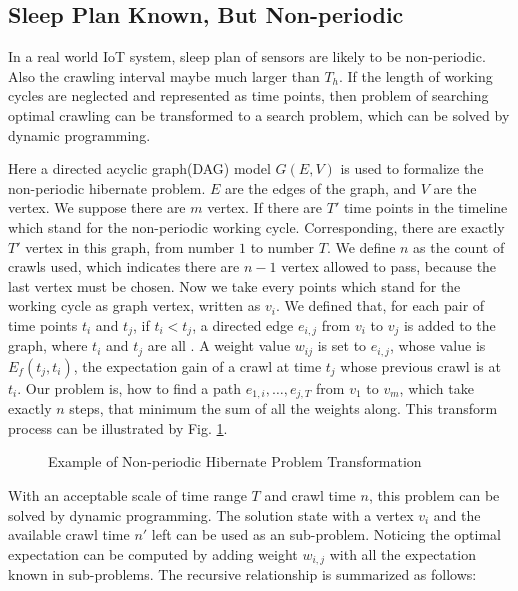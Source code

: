 \documentclass[conference]{IEEEtran}
\begin{document}
\subsection{Sleep Plan Known, But Non-periodic}
In a real world IoT system, sleep plan of sensors are likely to be non-periodic. Also the crawling interval maybe much larger than $T_h$. 
If the length of working cycles are neglected and represented as time points, then problem of searching optimal crawling can be transformed to a search problem, which can be solved by dynamic programming.


Here a directed acyclic graph(DAG) model $G(E,V)$ is used to formalize the non-periodic hibernate problem.
$E$ are the edges of the graph, and $V$ are the vertex. We suppose there are $m$ vertex. 
If there are $T'$ time points in the timeline which stand for the non-periodic working cycle. Corresponding, there are exactly $T'$ vertex in this graph, from number $1$ to number $T$. 
We define $n$ as the count of crawls used, which indicates there are $n-1$ vertex allowed to pass, because the last vertex must be chosen. 
Now we take every points which stand for the working cycle as graph vertex, written as $v_i$. We defined that, for each pair of time points $t_i$ and $t_j$, if $t_i<t_j$, a directed edge $e_{i,j}$ from $v_i$ to $v_j$ is added to the graph, where $t_i$ and $t_j$ are all . A weight value $w_{ij}$ is set to $e_{i,j}$, whose value is $E_f(t_j, t_i)$, the expectation gain of a crawl at time $t_j$ whose previous crawl is at $t_i$.
Our problem is, how to find a path $e_{1,i},\ldots,e_{j,T}$ from $v_1$ to $v_m$, which take exactly $n$ steps, that minimum the sum of all the weights along. This transform process can be illustrated by Fig. \ref{fig:problemtrans}.

\begin{figure}
	\centering
	
	\captionsetup{justification=centering}
	\caption{Example of Non-periodic Hibernate Problem Transformation}
	\label{fig:problemtrans}
\end{figure}


With an acceptable scale of time range $T$ and crawl time $n$, this problem can be solved by dynamic programming. The solution state with a vertex $v_i$ and the available crawl time $n'$ left can be used as an sub-problem. Noticing the optimal expectation can be computed by adding weight $w_{i,j}$ with all the expectation known in sub-problems. The recursive relationship is summarized as follows:
\end{document}
